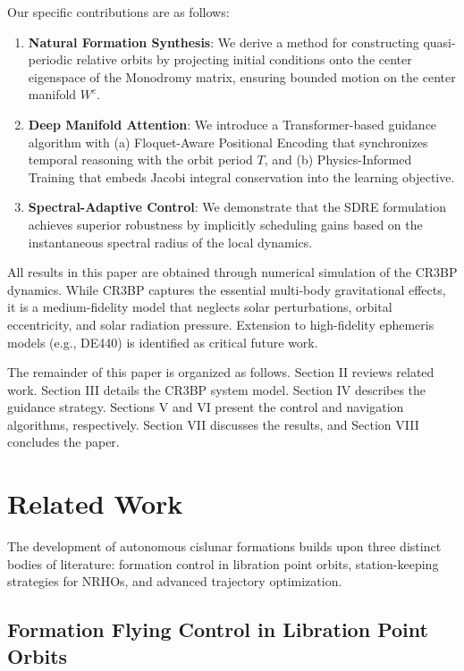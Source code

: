 \documentclass[10pt,letterpaper]{article}
\begin{document}
Our specific contributions are as follows:
\begin{enumerate}
    \item \textbf{Natural Formation Synthesis}: We derive a method for constructing quasi-periodic relative orbits by projecting initial conditions onto the center eigenspace of the Monodromy matrix, ensuring bounded motion on the center manifold $W^c$.
    \item \textbf{Deep Manifold Attention}: We introduce a Transformer-based guidance algorithm with (a) Floquet-Aware Positional Encoding that synchronizes temporal reasoning with the orbit period $T$, and (b) Physics-Informed Training that embeds Jacobi integral conservation into the learning objective.
    \item \textbf{Spectral-Adaptive Control}: We demonstrate that the SDRE formulation achieves superior robustness by implicitly scheduling gains based on the instantaneous spectral radius of the local dynamics.
\end{enumerate}

All results in this paper are obtained through numerical simulation of the CR3BP dynamics. While CR3BP captures the essential multi-body gravitational effects, it is a medium-fidelity model that neglects solar perturbations, orbital eccentricity, and solar radiation pressure. Extension to high-fidelity ephemeris models (e.g., DE440) is identified as critical future work.

The remainder of this paper is organized as follows. Section II reviews related work. Section III details the CR3BP system model. Section IV describes the guidance strategy. Sections V and VI present the control and navigation algorithms, respectively. Section VII discusses the results, and Section VIII concludes the paper.

\section{Related Work}

The development of autonomous cislunar formations builds upon three distinct bodies of literature: formation control in libration point orbits, station-keeping strategies for NRHOs, and advanced trajectory optimization.

\subsection{Formation Flying Control in Libration Point Orbits}
\end{document}
